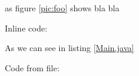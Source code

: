 



as figure \ref{pic:foo} shows bla bla



Inline code: 

As we can see in listing \ref{Main.java}

Code from file:






\cite{SomeRef}

\blindtext





